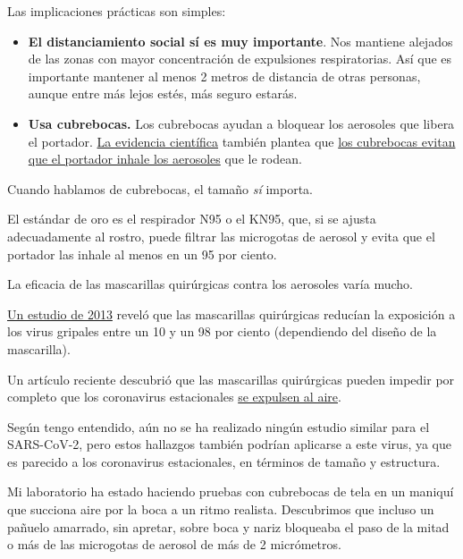 Las implicaciones prácticas son simples:

\begin{itemize}
\item
  \textbf{El distanciamiento social sí es muy importante}. Nos mantiene
  alejados de las zonas con mayor concentración de expulsiones
  respiratorias. Así que es importante mantener al menos 2 metros de
  distancia de otras personas, aunque entre más lejos estés, más seguro
  estarás.
\item
  \textbf{Usa cubrebocas.} Los cubrebocas ayudan a bloquear los
  aerosoles que libera el portador.
  \href{https://ucsf.app.box.com/s/blvolkp5z0mydzd82rjks4wyleagt036}{La
  evidencia científica} también plantea que
  \href{https://www.nytimes.com/2020/07/27/health/coronavirus-mask-protection.html?campaign_id=154\&emc=edit_cb_20200727\&instance_id=20696\&nl=coronavirus-briefing\&regi_id=65413713\&segment_id=34503\&te=1\&user_id=bd32fbf008e5183a7928ed61c60669f7}{los
  cubrebocas evitan que el portador inhale los aerosoles} que le rodean.
\end{itemize}

Cuando hablamos de cubrebocas, el tamaño \emph{sí} importa.

El estándar de oro es el respirador N95 o el KN95, que, si se ajusta
adecuadamente al rostro, puede filtrar las microgotas de aerosol y evita
que el portador las inhale al menos en un 95 por ciento.

La eficacia de las mascarillas quirúrgicas contra los aerosoles varía
mucho.

\href{https://pubmed.ncbi.nlm.nih.gov/23498357/}{Un estudio de 2013}
reveló que las mascarillas quirúrgicas reducían la exposición a los
virus gripales entre un 10 y un 98 por ciento (dependiendo del diseño de
la mascarilla).

Un artículo reciente descubrió que las mascarillas quirúrgicas pueden
impedir por completo que los coronavirus estacionales
\href{https://www.nature.com/articles/s41591-020-0843-2}{se expulsen al
aire}.

Según tengo entendido, aún no se ha realizado ningún estudio similar
para el SARS-CoV-2, pero estos hallazgos también podrían aplicarse a
este virus, ya que es parecido a los coronavirus estacionales, en
términos de tamaño y estructura.

Mi laboratorio ha estado haciendo pruebas con cubrebocas de tela en un
maniquí que succiona aire por la boca a un ritmo realista. Descubrimos
que incluso un pañuelo amarrado, sin apretar, sobre boca y nariz
bloqueaba el paso de la mitad o más de las microgotas de aerosol de más
de 2 micrómetros.

